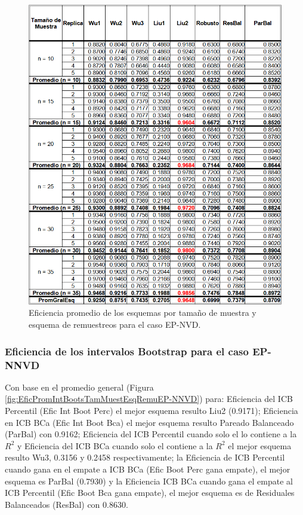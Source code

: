 \begin{figure}[ht] 
	\centering 
	\includegraphics[width=0.70\linewidth]{img/EP_NVD_Efic_Esq.png} 
	\caption{Eficiencia promedio de los esquemas por tamaño de muestra y esquema de remuestreos para el caso EP-NVD.} 
	\label{fig:EficPromEsqTamMuesEsqRemuEP-NVD}
\end{figure}
\FloatBarrier



\subsubsection{Eficiencia de los intervalos Bootstrap para el caso EP-NNVD}
Con base en el promedio general (Figura \ref{fig:EficPromIntBootsTamMuestEsqRemuEP-NNVD}) para: Eficiencia del ICB Percentil (Efic Int Boot Perc) el mejor esquema resulto Liu2 (0.9171); 
Eficiencia en ICB BCa (Efic Int Boot Bca) el mejor esquema resulto Pareado Balanceado (ParBal) con 0.9162;
 Eficiencia del ICB Percentil cuando solo el lo contiene a la $R^{2}$ y Eficiencia del ICB BCa cuando solo el contiene a la $R^{2}$ el mejor esquema resulto Wu3, 0.3156 y 0.2458 respectivamente;
 la Eficiencia de ICB Percentil cuando gana en el empate a ICB BCa (Efic Boot Perc gana empate), el mejor esquema es ParBal (0.7930) y la Eficiencia ICB BCa cuando gana el empate al ICB Percentil (Efic Boot Bca gana empate), el mejor esquema es de Residuales Balanceados (ResBal) con 0.8630.\\


